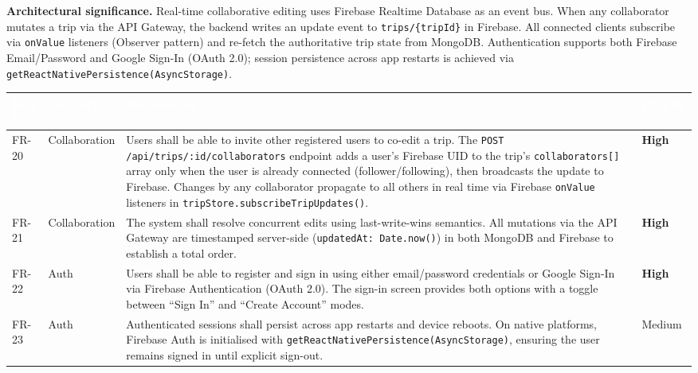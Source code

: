 \documentclass[12pt, a4paper]{article}
\newcommand{\reqid}[1]{\textsc{\small #1}}
\newcommand{\high}{\textbf{High}}
\newcommand{\medium}{Medium}
\newcommand{\thcell}[1]{\textcolor{white}{\textbf{\small #1}}}
\begin{document}
\begin{tcolorbox}[notebox]
  \textbf{Architectural significance.} Real-time collaborative editing uses Firebase Realtime Database as an event bus. When any collaborator mutates a trip via the API Gateway, the backend writes an update event to \texttt{trips/\{tripId\}} in Firebase. All connected clients subscribe via \texttt{onValue} listeners (Observer pattern) and re-fetch the authoritative trip state from MongoDB. Authentication supports both Firebase Email/Password and Google Sign-In (OAuth 2.0); session persistence across app restarts is achieved via \texttt{getReactNativePersistence(AsyncStorage)}.
\end{tcolorbox}

\vspace{0.4em}
\begin{longtable}{C{1.6cm} C{2.0cm} L{8.2cm} C{1.8cm}}
\toprule
{}
\thcell{Req ID} & \thcell{Category} & \thcell{Requirement} & \thcell{Priority} \\
\midrule
\endhead
\bottomrule
\endfoot

\reqid{FR-20} & Collaboration &
Users shall be able to invite other registered users to co-edit a trip. The \texttt{POST /api/trips/:id/collaborators} endpoint adds a user's Firebase UID to the trip's \texttt{collaborators[]} array only when the user is already connected (follower/following), then broadcasts the update to Firebase. Changes by any collaborator propagate to all others in real time via Firebase \texttt{onValue} listeners in \texttt{tripStore.subscribeTripUpdates()}. &
\high \\

\reqid{FR-21} & Collaboration &
The system shall resolve concurrent edits using last-write-wins semantics. All mutations via the API Gateway are timestamped server-side (\texttt{updatedAt: Date.now()}) in both MongoDB and Firebase to establish a total order. &
\high \\

\reqid{FR-22} & Auth &
Users shall be able to register and sign in using either email/password credentials or Google Sign-In via Firebase Authentication (OAuth 2.0). The sign-in screen provides both options with a toggle between ``Sign In'' and ``Create Account'' modes. &
\high \\

\reqid{FR-23} & Auth &
Authenticated sessions shall persist across app restarts and device reboots. On native platforms, Firebase Auth is initialised with \texttt{getReactNativePersistence(AsyncStorage)}, ensuring the user remains signed in until explicit sign-out. &
\medium \\

\end{longtable}
\end{document}
